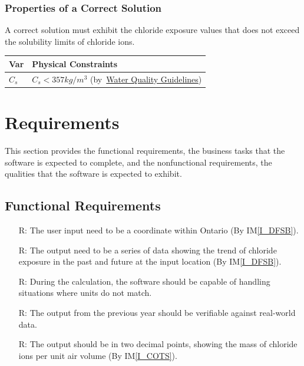 \documentclass[12pt]{article}
\newcommand{\iref}[1]{IM\ref{#1}}
\newcounter{reqnum} %
\begin{document}
\noindent 
\subsubsection{Properties of a Correct Solution} \label{sec_CorrectSolution}

\noindent
A correct solution must exhibit the chloride exposure values that does not exceed the solubility limits of chloride ions. 


\begin{table}[!h]
\caption{Output Variables} \label{TblOutputVar}
\renewcommand{\arraystretch}{1.2}
\noindent \begin{longtable*}{l l} 
  \toprule
  \textbf{Var} & \textbf{Physical Constraints} \\
  \midrule 
  $C_s$ & $C_s < 357 kg/m^3$ (by~\href{https://www2.gov.bc.ca/assets/gov/environment/air-land-water/water/waterquality/water-quality-guidelines/approved-wqgs/chloride-or.pdf}{Water Quality Guidelines}) \\
  
   \bottomrule
\end{longtable*}
\end{table}

\newpage
\section{Requirements}
This section provides the functional requirements, the business tasks that the
software is expected to complete, and the nonfunctional requirements, the
qualities that the software is expected to exhibit.

\indent 
\newpage
\subsection{Functional Requirements}

\begin{itemize}

\item[R\refstepcounter{reqnum}\thereqnum \label{R_Inputs}:] The user input need to be a coordinate within Ontario (By \iref{I_DFSB}).

\item[R\refstepcounter{reqnum}\thereqnum \label{R_OutputInputs}:] The output need to be a series of data showing the trend of chloride exposure in the past and future at the input location (By \iref{I_DFSB}).

\item[R\refstepcounter{reqnum}\thereqnum \label{R_Calculate}:] During the calculation, the software should be capable of handling situations where units do not match.


\item[R\refstepcounter{reqnum}\thereqnum \label{R_VerifyOutput}:] The output from the previous year should be verifiable against real-world data.


\item[R\refstepcounter{reqnum}\thereqnum \label{R_Output}:] The output should be in two decimal points, showing the mass of chloride ions per unit air volume (By \iref{I_COTS}).


\end{itemize}
\end{document}

